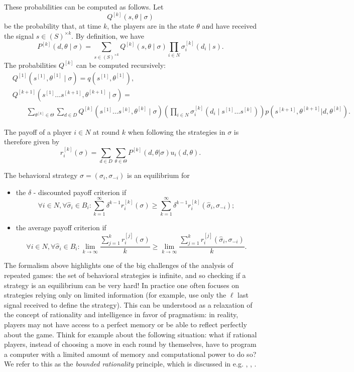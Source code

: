 These probabilities can be computed as follows. Let
$$Q^{[k]}(s,\theta \mid \sigma) $$
be the probability that, at time $k$, the players are in the state $\theta$ and have received the signal $s \in (S)^{\times k}$.
By definition, we have
$$ P^{[k]}(d, \theta \mid \sigma) = \sum_{s \in (S)^{\times k}} Q^{[k]}(s, \theta \mid \sigma) \prod_{i \in N} \sigma^{[k]}_i(d_i \mid s). $$
The probabilities $Q^{[k]}$ can be computed recursively:
\begin{equation*}
\begin{aligned}
& Q^{[1]}(s^{[1]}, \theta^{[1]} \mid \sigma)  = q(s^{[1]}, \theta^{[1]}), \\
& Q^{[k+1]}(s^{[1]} \ldots s^{[k+1]}, \theta^{[k+1]} \mid \sigma) =  \\
& \qquad \sum_{\theta^{[k]} \in \Theta} \sum_{d \in D} Q^{[k]}(s^{[1]} \ldots s^{[k]}, \theta^{[k]} \mid \sigma) \left( \prod_{i \in N} \sigma_i^{[k]}(d_i \mid s^{[1]} \ldots s^{[k]}) \right ) p(s^{[k+1]}, \theta^{[k+1]}|d,\theta^{[k]}).
\end{aligned}
\end{equation*}

The payoff of a player $i  \in N$ at round $k$ when following the strategies in $\sigma$ is therefore given by
$$ r_i^{[k]}(\sigma)  = \sum_{d \in D} \sum_{\theta \in \Theta} P^{[k]}(d, \theta|\sigma) u_i(d,\theta).$$

\begin{definition}[Equilibrium]
The behavioral strategy $\sigma=(\sigma_i,\sigma_{-i})$ is an equilibrium for
\begin{itemize}
\item the $\delta$ - discounted payoff criterion if
	$$\forall i \in N, \forall \hat{\sigma}_i \in B_i: \sum_{k = 1}^\infty \delta^{k-1} r_i^{[k]}(\sigma) \geq \sum_{k = 1}^\infty \delta^{k-1} r_i^{[k]}(\hat{\sigma}_i,\sigma_{-i});$$
\item the average payoff criterion if
	$$\forall i \in N, \forall \hat{\sigma}_i \in B_i: \lim_{k \rightarrow \infty}\frac{\sum_{j = 1}^k r_i^{[j]}(\sigma)}{k} \geq \lim_{k \rightarrow \infty}\frac{\sum_{j = 1}^k r_i^{[j]}(\hat{\sigma}_i,\sigma_{-i})}{k}.$$
\end{itemize}
\end{definition}

The formalism above highlights one of the big challenges of the analysis of repeated games: the set of behavioral strategies is infinite, and so checking if a strategy is an equilibrium can be very hard!
In practice one often focuses on strategies relying only on limited information (for example, use only the $\ell$ last signal received to define the strategy). This can be understood as a relaxation of the concept of rationality and intelligence in favor of pragmatism: in reality,  players may not have access to a perfect memory or be able to reflect perfectly about the game. Think for example about the following situation: what if rational players, instead of choosing a move in each round by themselves,  have to program a computer with a limited amount of memory and computational power to do so?
We refer to this as the \emph{bounded rationality} principle, which is discussed in e.g.  \cite{RuMBR}, \cite[Section 6.1.3]{ShLeMSAG}, \cite[Chapter 9]{OsRuACIG}.


